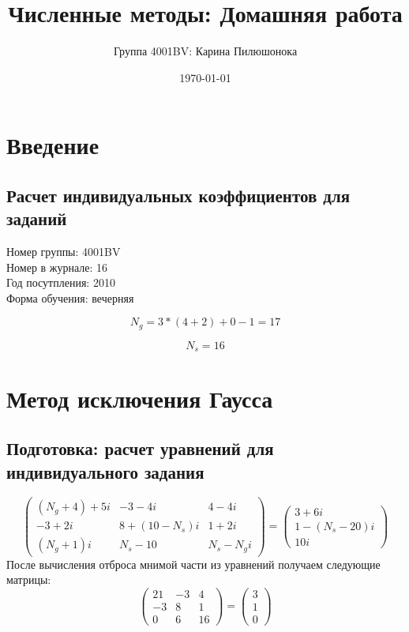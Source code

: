 \documentclass{article}
\title{Численные методы: Домашняя работа}
\author{Группа 4001BV: Карина Пилюшонока}
\date \today
\begin{document}
\maketitle
\newpage
\tableofcontents
\newpage
\section{Введение}
\subsection{Расчет индивидуальных коэффициентов для заданий}
Номер группы: 4001BV \\
Номер в журнале: 16 \\
Год посутпления: 2010 \\
Форма обучения: вечерняя


\begin{displaymath} 
  N_{g} = 3 * (4 + 2) + 0 - 1 = 17
\end{displaymath}

\begin{displaymath}
  N_{s} = 16
\end{displaymath}
\section{Метод исключения Гаусса}
\subsection{Подготовка: расчет уравнений для индивидуального задания}
\begin{displaymath}
\left(
  \begin{array}{ccc}
    (N_{g}+4)+5i & -3-4i & 4-4i \\
    -3+2i & 8+(10-N_{s})i & 1+2i \\
    (N_{g}+1)i & N_{s}-10 & N_{s}-N_{g}i
  \end{array}
\right)
=
\left(
  \begin{array}{ccc}
    3+6i\\
    1-(N_{s}-20)i\\
    10i
  \end{array}
\right)
\end{displaymath}
После вычисления отброса мнимой части из уравнений получаем следующие матрицы:
\begin{displaymath}
\left(
  \begin{array}{ccc}
    21 & -3 & 4 \\
    -3 & 8 & 1 \\
    0 & 6 & 16
  \end{array}
\right)
=
\left(
  \begin{array}{ccc}
    3\\
    1\\
    0
  \end{array}
\right)
\end{displaymath}
\end{document}
